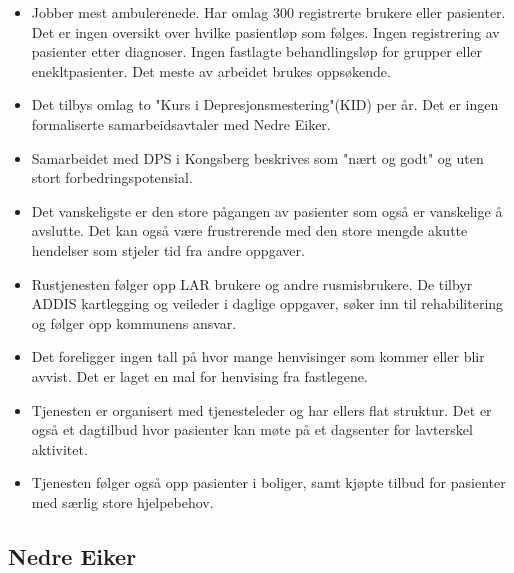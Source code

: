 \documentclass[11pt]{report} %
\begin{document}
                        \begin{itemize}
                    	      \item Jobber mest ambulerenede. Har omlag 300 registrerte brukere eller pasienter. Det er ingen oversikt over hvilke pasientløp som følges. Ingen registrering av pasienter etter  diagnoser. Ingen fastlagte behandlingsløp for grupper eller enekltpasienter. Det meste av arbeidet brukes oppsøkende. \\
                            \item Det tilbys omlag to "Kurs i Depresjonsmestering"(KID) per år. Det er ingen formaliserte samarbeidsavtaler med Nedre Eiker. \\
                            \item Samarbeidet med DPS i Kongsberg beskrives som "nært og godt" og uten stort forbedringspotensial.\\
                            \item Det vanskeligste er den store pågangen av pasienter som også er vanskelige å avslutte. Det kan også være frustrerende med den store mengde akutte hendelser som stjeler tid fra andre oppgaver.\\ 
                            \item Rustjenesten følger opp LAR brukere og andre rusmisbrukere. De tilbyr ADDIS kartlegging og veileder i daglige oppgaver, søker inn til rehabilitering og følger opp kommunens ansvar.\\
                            \item Det foreligger ingen tall på hvor mange henvisinger som kommer eller blir avvist. Det er laget en mal for henvising fra fastlegene. \\
                            \item Tjenesten er organisert med tjenesteleder og har ellers flat struktur. Det er også et dagtilbud hvor pasienter kan møte på et dagsenter for lavterskel aktivitet. \\
                            \item Tjenesten følger også opp pasienter i boliger, samt kjøpte tilbud for pasienter med særlig store hjelpebehov. \\
                        \end{itemize}
                    

                  \subsection{Nedre Eiker}\label{sec:org_nek}
\end{document}
